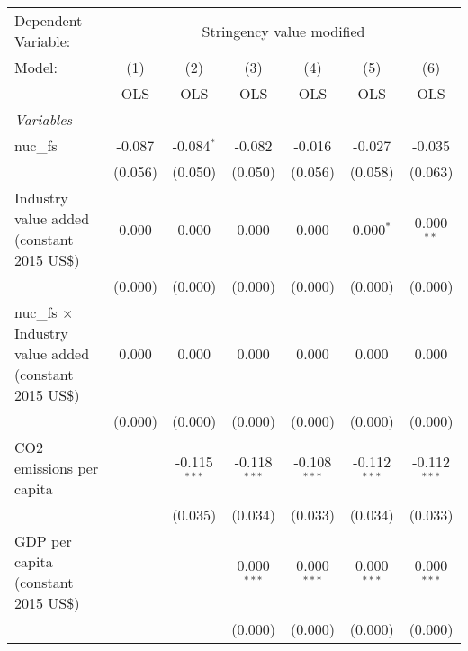 
\begingroup
\centering
\begin{tabular}{lcccccc}
   \toprule
   Dependent Variable: & \multicolumn{6}{c}{Stringency value modified}\\
   Model:                                                        & (1)     & (2)            & (3)            & (4)            & (5)            & (6)\\  
                                                                 &  OLS    & OLS            & OLS            & OLS            & OLS            & OLS\\  
   \midrule
   \emph{Variables}\\
   nuc\_fs                                                       & -0.087  & -0.084$^{*}$   & -0.082         & -0.016         & -0.027         & -0.035\\   
                                                                 & (0.056) & (0.050)        & (0.050)        & (0.056)        & (0.058)        & (0.063)\\   
   Industry value added (constant 2015 US\$)                     & 0.000   & 0.000          & 0.000          & 0.000          & 0.000$^{*}$    & 0.000$^{**}$\\   
                                                                 & (0.000) & (0.000)        & (0.000)        & (0.000)        & (0.000)        & (0.000)\\   
   nuc\_fs $\times$ Industry value added (constant 2015 US\$)    & 0.000   & 0.000          & 0.000          & 0.000          & 0.000          & 0.000\\   
                                                                 & (0.000) & (0.000)        & (0.000)        & (0.000)        & (0.000)        & (0.000)\\   
   CO2 emissions per capita                                      &         & -0.115$^{***}$ & -0.118$^{***}$ & -0.108$^{***}$ & -0.112$^{***}$ & -0.112$^{***}$\\   
                                                                 &         & (0.035)        & (0.034)        & (0.033)        & (0.034)        & (0.033)\\   
   GDP per capita (constant 2015 US\$)                           &         &                & 0.000$^{***}$  & 0.000$^{***}$  & 0.000$^{***}$  & 0.000$^{***}$\\   
                                                                 &         &                & (0.000)        & (0.000)        & (0.000)        & (0.000)\\   

\end{tabular}

